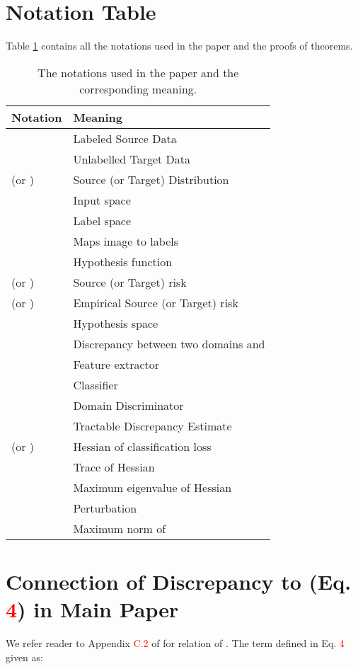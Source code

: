 \documentclass[table,dvipsnames]{article}
\theoremstyle{plain}
\theoremstyle{definition}
\theoremstyle{remark}
\begin{document}
\newpage
\appendix


\onecolumn


\section{Notation Table}
\label{app:notn_tab}
Table \ref{tab:notation} contains all the notations used in the paper and the proofs of theorems. 
\begin{table}[h!]
 \caption{The notations used in the paper and the corresponding meaning.}
    \centering
    \begin{tabular}{l|l}
    \hline
         \textbf{Notation} & \textbf{Meaning} \\
        \hline \hline
          & Labeled Source Data \\
          & Unlabelled Target Data \\
          (or ) & Source (or Target) Distribution \\
          & Input space \\
          & Label space \\
          & Maps image to labels \\
          & Hypothesis function \\
          (or ) & Source (or Target) risk \\
          (or ) & Empirical Source (or Target) risk \\
          & Hypothesis space \\
          & Discrepancy between two domains  and  \\
          & Feature extractor \\
          & Classifier \\
          & Domain Discriminator \\
          & Tractable Discrepancy Estimate\\
          (or ) & Hessian of classification loss\\
          & Trace of Hessian\\
          & Maximum eigenvalue of Hessian\\
          & Perturbation \\
          & Maximum norm of \\
         
    \end{tabular}
   
    \label{tab:notation}
\end{table}

\section{Connection of Discrepancy to  (Eq. \textcolor{red}{4}) in Main Paper}\label{app:discrepancy}
We refer reader to Appendix \textcolor{red}{C.2} of \citet{acuna2021f} for relation of . The  term defined in Eq. \textcolor{red}{4} given as:
\end{document}
